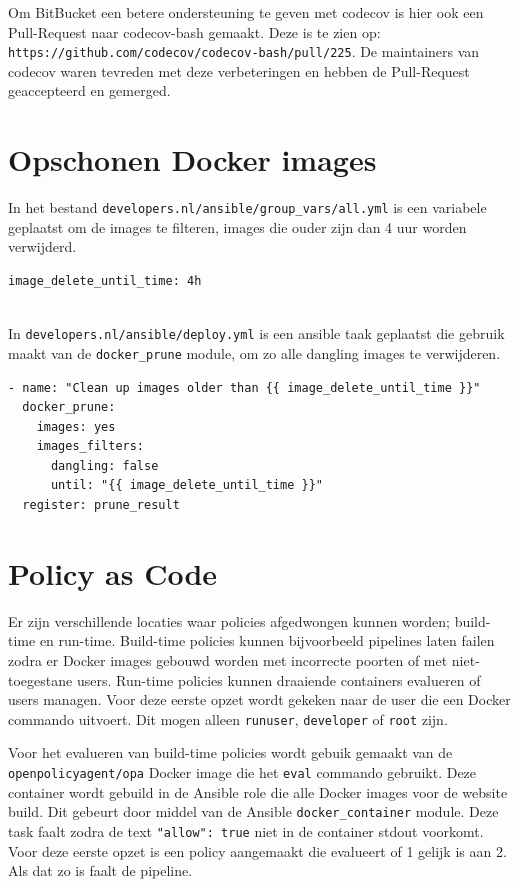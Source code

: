 Om BitBucket een betere ondersteuning te geven met codecov is hier ook een Pull-Request naar codecov-bash gemaakt. Deze is te zien op:\\ \texttt{https://github.com/codecov/codecov-bash/pull/225}. De maintainers van codecov waren tevreden met deze verbeteringen en hebben de Pull-Request geaccepteerd en gemerged.

\section{Opschonen Docker images}
In het bestand \texttt{developers.nl/ansible/group\_vars/all.yml} is een variabele geplaatst om de images te filteren, images die ouder zijn dan 4 uur worden verwijderd.
\begin{verbatim}
image_delete_until_time: 4h
\end{verbatim}
\\In \texttt{developers.nl/ansible/deploy.yml} is een ansible taak geplaatst die gebruik maakt van de \texttt{docker\_prune} module, om zo alle dangling images te verwijderen.
\begin{verbatim}
- name: "Clean up images older than {{ image_delete_until_time }}"
  docker_prune:
    images: yes
    images_filters:
      dangling: false
      until: "{{ image_delete_until_time }}"
  register: prune_result
\end{verbatim}

\section{Policy as Code}

Er zijn verschillende locaties waar policies afgedwongen kunnen worden; build-time en run-time. Build-time policies kunnen bijvoorbeeld pipelines laten failen zodra er Docker images gebouwd worden met incorrecte poorten of met niet-toegestane users. Run-time policies kunnen draaiende containers evalueren of users managen. Voor deze eerste opzet wordt gekeken naar de user die een Docker commando uitvoert. Dit mogen alleen \texttt{runuser}, \texttt{developer} of \texttt{root} zijn. 

Voor het evalueren van build-time policies wordt gebuik gemaakt van de \texttt{openpolicyagent/opa} Docker image die het \texttt{eval} commando gebruikt. Deze container wordt gebuild in de Ansible role die alle Docker images voor de website build. Dit gebeurt door middel van de Ansible \texttt{docker\_container} module. Deze task faalt zodra de text \texttt{"allow": true} niet in de container stdout voorkomt. Voor deze eerste opzet is een policy aangemaakt die evalueert of 1 gelijk is aan 2. Als dat zo is faalt de pipeline.

